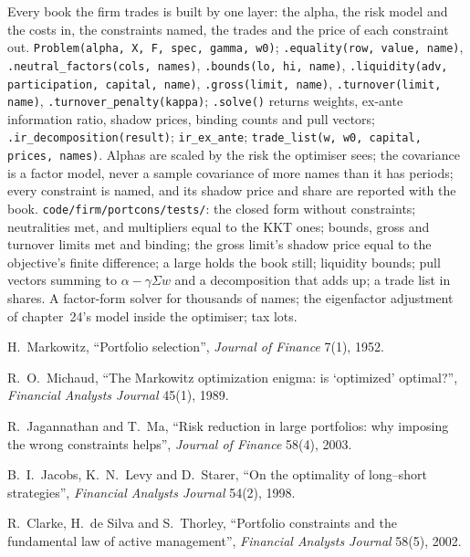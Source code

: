 \begin{build}
 Every book the firm trades is built by one layer: the alpha, the risk model and the costs in, the constraints named, the trades and the price of
each constraint out.
 \texttt{Problem(alpha, X, F, spec, gamma, w0)}; \texttt{.equality(row, value, name)}, \texttt{.neutral\_factors(cols, names)},
\texttt{.bounds(lo, hi, name)}, \texttt{.liquidity(adv, participation, capital, name)}, \texttt{.gross(limit, name)}, \texttt{.turnover(limit, name)},
\texttt{.turnover\_penalty(kappa)}; \texttt{.solve()} returns weights, ex-ante information ratio, shadow prices, binding counts and pull vectors;
\texttt{.ir\_decomposition(result)}; \texttt{ir\_ex\_ante}; \texttt{trade\_list(w, w0, capital, prices, names)}.
 Alphas are scaled by the risk the optimiser sees; the covariance is a factor model, never a sample covariance of more names than it has periods;
every constraint is named, and its shadow price and share are reported with the book.
 \texttt{code/firm/portcons/tests/}: the closed form without constraints; neutralities met, and multipliers equal to the KKT ones; bounds,
gross and turnover limits met and binding; the gross limit's shadow price equal to the objective's finite difference; a large  holds the book still;
liquidity bounds; pull vectors summing to $\alpha - \gamma\Sigma w$ and a decomposition that adds up; a trade list in shares.
 A factor-form solver for thousands of names; the eigenfactor adjustment of chapter~24's model inside the optimiser; tax lots.
\end{build}

\begin{omsources}
\item H.~Markowitz, ``Portfolio selection'', \emph{Journal of Finance} 7(1), 1952.
\item R.~O.~Michaud, ``The Markowitz optimization enigma: is `optimized' optimal?'', \emph{Financial Analysts Journal} 45(1), 1989.
\item R.~Jagannathan and T.~Ma, ``Risk reduction in large portfolios: why imposing the wrong constraints helps'', \emph{Journal of Finance} 58(4), 2003.
\item B.~I.~Jacobs, K.~N.~Levy and D.~Starer, ``On the optimality of long--short strategies'', \emph{Financial Analysts Journal} 54(2), 1998.
\item R.~Clarke, H.~de Silva and S.~Thorley, ``Portfolio constraints and the fundamental law of active management'', \emph{Financial Analysts Journal} 58(5), 2002.
\end{omsources}

